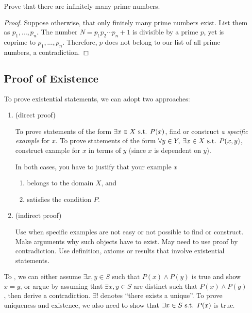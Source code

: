 \begin{example}[Euclid]
Prove that there are infinitely many prime numbers.

\begin{proof}
Suppose otherwise, that only finitely many prime numbers exist. List them as $p_1,\dots,p_n$. The number $N=p_1p_2\cdots p_n+1$ is divisible by a prime $p$, yet is coprime to $p_1,\dots,p_n$. Therefore, $p$ does not belong to our list of all prime numbers, a contradiction.
\end{proof}
\end{example}

\subsection{Proof of Existence}
To prove existential statements, we can adopt two approaches:
\begin{enumerate}
\item {} (direct proof)

To prove statements of the form $\exists x\in X \text{ s.t. } P(x)$, find or construct \emph{a specific example} for $x$. To prove statements of the form $\forall y\in Y,\:\exists x\in X\text{ s.t. } P(x,y)$, construct example for $x$ in terms of $y$ (since $x$ is dependent on $y$).

In both cases, you have to justify that your example $x$
\begin{enumerate}
\item belongs to the domain $X$, and
\item satisfies the condition $P$.
\end{enumerate}

\item {} (indirect proof)

Use when specific examples are not easy or not possible to find or construct.
Make arguments why such objects have to exist.
May need to use proof by contradiction.
Use definition, axioms or results that involve existential statements.
\end{enumerate}

To , we can either assume $\exists x,y \in S$ such that $P(x) \land P(y)$ is true and show $x=y$, or argue by assuming that $\exists x,y \in S$ are distinct such that $P(x) \land P(y)$, then derive a contradiction. $\exists!$ denotes ``there exists a unique''. To prove uniqueness and existence, we also need to show that $\exists x \in S \text{ s.t. } P(x)$ is true.

